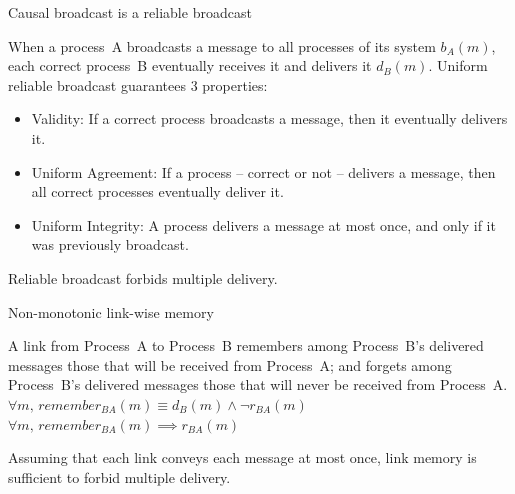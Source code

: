 \documentclass[10pt, xcolor={usenames, dvipsnames}]{beamer}
\begin{document}
\begin{frame}{Causal broadcast is a reliable broadcast}

  \begin{definition} 
    When a process~A broadcasts a message to all processes of its system $b_A(m)$,
    each correct process~B eventually receives it and delivers it
    $d_B(m)$. Uniform reliable broadcast guarantees 3 properties:
    \begin{itemize}
    \item Validity: If a correct process broadcasts a message, then it
      eventually delivers it.
    \item Uniform Agreement: If a process -- correct or not -- delivers a message,
      then all correct processes eventually deliver it.
    \item Uniform Integrity: A process delivers a message at most once, and only if
      it was previously broadcast.
    \end{itemize}
  \end{definition}
  
  \vspace{2em}

  Reliable broadcast forbids multiple delivery.
    
\end{frame}


\begin{frame}{Non-monotonic link-wise memory}

  \begin{definition}
    A link from Process~A to Process~B remembers among Process~B's delivered
    messages those that will be received from Process~A; and forgets among
    Process~B's delivered messages those that will never be received from
    Process~A.\\
    $\forall m,\, remember_{BA}(m) \equiv d_B(m) \wedge \neg r_{BA}(m)$ \\
    $\forall m,\, remember_{BA}(m) \implies r_{BA}(m)$
  \end{definition}

  \vspace{2em}

  \begin{theorem}
    Assuming that each link conveys each message at most once, link memory is
    sufficient to forbid multiple delivery.
  \end{theorem}

\end{frame}
\end{document}
